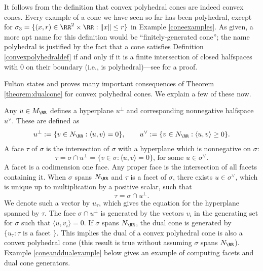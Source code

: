 \documentclass[12pt]{amsart}
\theoremstyle{plain}
\begin{document}
It follows from the definition that convex polyhedral cones are indeed convex cones.
Every example of a cone we have seen so far has been polyhedral, except for $\sigma_3 = \{(x, r) \in \RR^2 \times \RR : \|x\| \le r\}$ in Example \ref{coneexamples}.
As given, a more apt name for this definition would be ``finitely-generated cone'';
the name polyhedral is justified by the fact that a cone satisfies Definition \ref{convexpolyhedraldef} if and only if it is a finite intersection of closed halfspaces with $0$ on their boundary (i.e., is polyhedral)---see \cite[\S 1.3]{DLHK13} for a proof.

Fulton \cite[\S 1.2]{Fulton93} states and proves many important consequences of Theorem \ref{theorem:dualcone} for convex polyhedral cones.
We explain a few of these now.

Any $u \in M_\RR$ defines a hyperplane $u^\perp$ and corresponding nonnegative halfspace $u^\vee$.
These are defined as
$$u^\perp := \{v \in N_\RR : \langle u, v\rangle = 0\}, \qquad u^\vee := \{v \in N_\RR : \langle u, v\rangle \ge 0\}.$$
A face $\tau$ of $\sigma$ is the intersection of $\sigma$ with a hyperplane which is nonnegative on $\sigma$:
$$\tau = \sigma \cap u^\perp = \{v \in \sigma : \langle u, v \rangle = 0\}, \, \text{for some } u \in \sigma^\vee.$$
A facet is a codimension one face. 
Any proper face is the intersection of all facets containing it.
When $\sigma$ spans $N_\RR$ and $\tau$ is a facet of $\sigma$, there exists $u \in \sigma^\vee$, which is unique up to multiplication by a positive scalar, such that
$$\tau = \sigma \cap u^\perp.$$
We denote such a vector by $u_\tau$, which gives the equation for the hyperplane spanned by $\tau$.
The face $\sigma \cap u^\perp$ is generated by the vectors $v_i$ in the generating set for $\sigma$ such that $\langle u, v_i\rangle = 0$.
If $\sigma$ spans $N_\RR$, the dual cone is generated by $\{u_\tau : \tau \text{ is a facet }\}$.
This implies the dual of a convex polyhedral cone is also a convex polyhedral cone (this result is true without assuming $\sigma$ spans $N_\RR$).
Example \ref{coneanddualexample} below gives an example of computing facets and dual cone generators.
\end{document}
